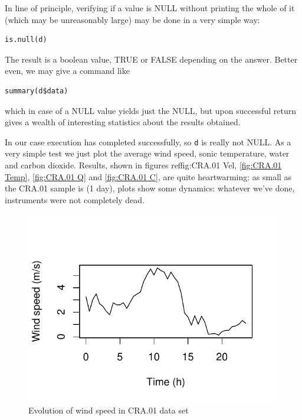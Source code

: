 \documentclass[a4paper,10pt]{book}
\begin{document}
In line of principle, verifying if a value is NULL without printing the whole of it (which may be unreasonably large) may be done in a very simple way:

\begin{verbatim}
is.null(d)
\end{verbatim}

The result is a boolean value, TRUE or FALSE depending on the answer. Better even, we may give a command like

\begin{verbatim}
summary(d$data)
\end{verbatim}

\noindent which in case of a NULL value yields just the NULL, but upon successful return gives a wealth of interesting statistics about the results obtained.

In our case execution has completed successfully, so \verb|d| is really not NULL. As a very simple test we just plot the average wind speed, sonic temperature, water and carbon dioxide. Results, shown in figures ref{fig:CRA.01 Vel}, \ref{fig:CRA.01 Temp}, \ref{fig:CRA.01 Q} and \ref{fig:CRA.01 C}, are quite heartwarming: as small as the CRA.01 sample is (1 day), plots show some dynamics: whatever we've done, instruments were not completely dead.

\begin{figure}[htp]
 \centering
 \begin{center}
 \includegraphics[scale=1.1,keepaspectratio=true]{./diagrams/CRA01_Vel.pdf}
 \end{center}
 \caption{Evolution of wind speed in CRA.01 data set}
 \label{fig:CRA.01 Vel}
\end{figure}
\end{document}
